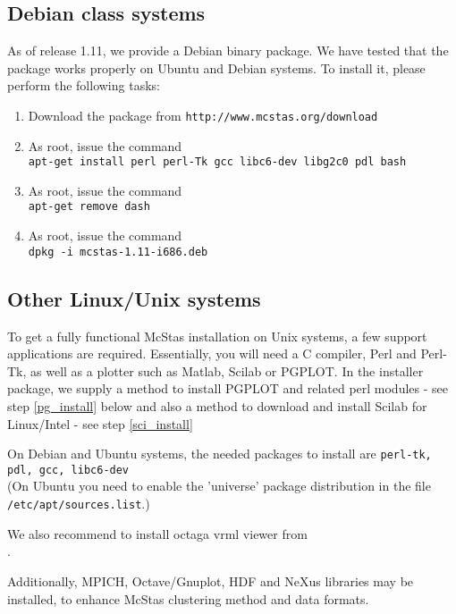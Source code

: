\subsection{Debian class systems}
\label{ss:deb_install}
As of release 1.11, we provide a Debian binary package. We have tested that the
package works properly on Ubuntu and Debian systems. To install it, please
perform the following tasks:
\begin{enumerate}
\item{Download the package from \verb+http://www.mcstas.org/download+}
\item{As root, issue the command \\\verb+apt-get install perl perl-Tk gcc libc6-dev libg2c0 pdl bash+}
\item{As root, issue the command \\\verb+apt-get remove dash+}
\item{As root, issue the command \\\verb+dpkg -i mcstas-1.11-i686.deb+}
\end{enumerate}

\subsection{Other Linux/Unix systems}
To get a fully functional McStas installation on Unix systems, a few support
applications are required. Essentially, you will need a C compiler,
Perl and Perl-Tk, as well as a plotter such as Matlab, Scilab or
PGPLOT. In the installer package, we supply a method to install PGPLOT
and related perl modules - see step \ref{pg_install} below and also
a method to download and install Scilab for Linux/Intel - see step \ref{sci_install}

\noindent On Debian and Ubuntu systems, the
needed packages to install are \texttt{perl-tk, pdl, gcc,
  libc6-dev} \\(On Ubuntu you need to enable the 'universe' package
distribution in the file \\\verb+/etc/apt/sources.list+.)

\noindent We also recommend to install octaga vrml viewer from
\\.

\noindent Additionally, MPICH, Octave/Gnuplot, HDF and NeXus libraries may be installed, to enhance McStas clustering method and data formats.

